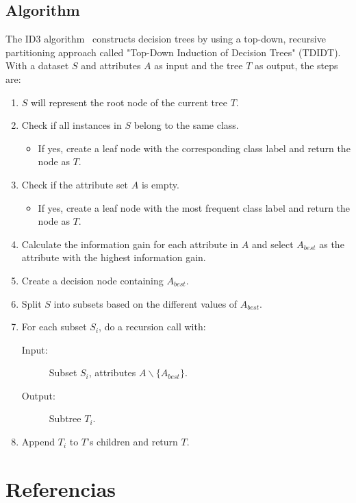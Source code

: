 \subsection{Algorithm}
The ID3 algorithm~\cite{id3_algorithm_wiki} constructs decision trees by using a top-down, recursive partitioning approach called "Top-Down Induction of Decision Trees" (TDIDT). With a dataset $S$ and attributes $A$ as input and the tree $T$ as output, the steps are:

\begin{enumerate}
	\item $S$ will represent the root node of the current tree $T$.
	\item Check if all instances in $S$ belong to the same class.
    \begin{itemize}
        \item If yes, create a leaf node with the corresponding class label and return the node as $T$.
    \end{itemize}
    \item Check if the attribute set $A$ is empty.
    \begin{itemize}
        \item If yes, create a leaf node with the most frequent class label and return the node as $T$.
    \end{itemize}
    \item Calculate the information gain for each attribute in $A$ and select $A_{best}$ as the attribute with the highest information gain.
    \item Create a decision node containing $A_{best}$.
    \item Split $S$ into subsets based on the different values of $A_{best}$.
    \item For each subset $S_i$, do a recursion call with:
    \begin{description}
    	\item[Input:] Subset $S_i$, attributes $A \backslash \{A_{best}\}$.
    	\item[Output:] Subtree $T_i$.
    \end{description}
    \item Append $T_i$ to $T$'s children and return $T$. 
\end{enumerate}



\section{Referencias}

